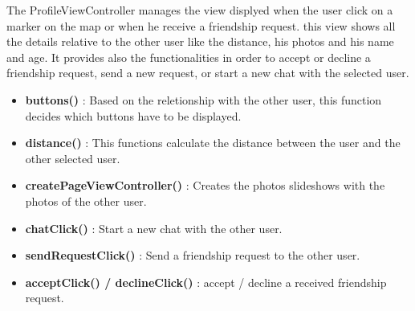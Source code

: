 The ProfileViewController manages the view displyed when the user click on a marker on the map or when he receive a friendship request. this view shows all the details relative to the other user like the distance, his photos and his name and age. It provides also the functionalities in order to accept or decline a friendship request, send a new request, or start a new chat with the selected user.

\begin{itemize}
\item \textbf{buttons()} : Based on the reletionship with the other user, this function decides which buttons have to be displayed.
\item \textbf{distance()} : This functions calculate the distance between the user and the other selected user.
\item \textbf{createPageViewController()} : Creates the photos slideshows with the photos of the other user.
\item \textbf{chatClick()} : Start a new chat with the other user.
\item \textbf{sendRequestClick()} : Send a friendship request to the other user.
\item \textbf{acceptClick() / declineClick()} : accept / decline a received friendship request.
\end{itemize}


